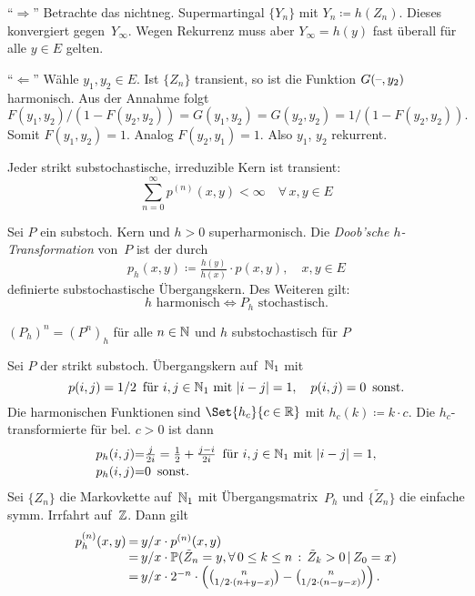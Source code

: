 \documentclass{cheat-sheet}
\renewcommand{\P}{\mathbb{P}} %
\begin{document}
\begin{beweisskizze}
  "`$\Rightarrow$"'
  Betrachte das nichtneg. Supermartingal $\{ Y_n \}$ mit $Y_n \coloneqq h(Z_n)$.
  Dieses konvergiert gegen~$Y_\infty$.
  Wegen Rekurrenz muss aber $Y_\infty = h(y)$ fast überall für alle $y \in E$ gelten.


  "`$\Leftarrow$"'
  Wähle $y_1, y_2 \in E$.
  Ist $\{ Z_n \}$ transient, so ist die Funktion $G(\text{--}, y_2)$ harmonisch.
  Aus der Annahme folgt
  \[
    F(y_1, y_2) / (1 - F(y_2, y_2)) = G(y_1, y_2) = G(y_2, y_2) = 1 / (1 - F(y_2, y_2)).
  \]
  Somit $F(y_1, y_2) = 1$.
  Analog $F(y_2, y_1) = 1$.
  Also $y_1$, $y_2$ rekurrent.
\end{beweisskizze}

\begin{bem}
  Jeder strikt substochastische, irreduzible Kern ist transient:
  \[
    {\sum}_{n=0}^\infty p^{(n)}(x, y) < \infty \quad
    \forall \, x, y \in E
  \]
\end{bem}

\begin{lemdefn}
  Sei $P$ ein substoch. Kern und $h > 0$ superharmonisch.
  Die \emph{Doob'sche $h$-Transformation} von~$P$ ist der durch
  \[
    p_h(x, y) \coloneqq \tfrac{h(y)}{h(x)} \cdot p(x, y), \quad
    x, y \in E
  \]
  definierte substochastische Übergangskern.
  Des Weiteren gilt:
  \[
    h \text{ harmonisch} \iff P_h \text{ stochastisch}.
  \]
\end{lemdefn}

\begin{lem}
  $(P_h)^n = (P^n)_h$ für alle $n \in \mathbb{N}$ und $h$ substochastisch für $P$
\end{lem}

\begin{bsp}
  Sei $P$ der strikt substoch. Übergangskern auf~$\mathbb{N}_1$ mit
  \[
    p(i, j) = 1/2 \enspace \text{für $i, j \in \mathbb{N}_1$ mit $\lvert i - j\rvert = 1$}, \quad
    p(i, j) = 0 \enspace \text{sonst.}
  \]
  Die harmonischen Funktionen sind $\Set{h_c}{c \in \R}$ mit $h_c(k) \coloneqq k \cdot c$.
  Die $h_c$-transformierte für bel. $c > 0$ ist dann
  \[
    \arraycolsep=0pt
    \begin{array}{r c l}
      p_h(i, j) &=& \tfrac{j}{2i} = \tfrac{1}{2} + \tfrac{j - i}{2i} \enspace \text{für $i, j \in \N_1$ mit $\abs{i - j} = 1$}, \\[0.2em]
      p_h(i, j) &=& 0 \enspace \text{sonst.}
    \end{array}
  \]
  Sei $\{ Z_n \}$ die Markovkette auf~$\mathbb{N}_1$ mit Übergangsmatrix~$P_h$ und $\{ \tilde{Z}_n \}$ die einfache symm. Irrfahrt auf~$\mathbb{Z}$.
  Dann gilt
  \[
    \arraycolsep=1pt
    \begin{array}{r c l}
      p_h^{(n)}(x, y)
        &=& y/x \cdot p^{(n)}(x, y) \\
        &=& y/x \cdot \P(\tilde{Z}_n = y, \fa{0 \leq k \leq n} \tilde{Z}_k > 0 \,|\, Z_0 = x) \\
        &=& y/x \cdot 2^{-n} \cdot \left( \binom{n}{1/2 \cdot (n + y - x)} - \binom{n}{1/2 \cdot (n - y - x)} \right).
    \end{array}
  \]
\end{bsp}
\end{document}
